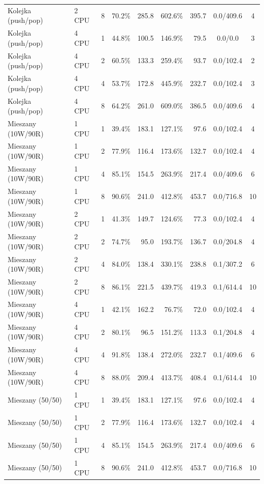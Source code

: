 \begin{table}[ht]
{\begin{tabular}{llcrrrrcc}
Kolejka (push/pop) & 2 CPU & 8 & 70.2\% & 285.8 & 602.6\% & 395.7 & 0.0/409.6 & 4 \\
Kolejka (push/pop) & 4 CPU & 1 & 44.8\% & 100.5 & 146.9\% & 79.5 & 0.0/0.0 & 3 \\
Kolejka (push/pop) & 4 CPU & 2 & 60.5\% & 133.3 & 259.4\% & 93.7 & 0.0/102.4 & 2 \\
Kolejka (push/pop) & 4 CPU & 4 & 53.7\% & 172.8 & 445.9\% & 232.7 & 0.0/102.4 & 3 \\
Kolejka (push/pop) & 4 CPU & 8 & 64.2\% & 261.0 & 609.0\% & 386.5 & 0.0/409.6 & 4 \\
Mieszany (10W/90R) & 1 CPU & 1 & 39.4\% & 183.1 & 127.1\% & 97.6 & 0.0/102.4 & 4 \\
Mieszany (10W/90R) & 1 CPU & 2 & 77.9\% & 116.4 & 173.6\% & 132.7 & 0.0/102.4 & 4 \\
Mieszany (10W/90R) & 1 CPU & 4 & 85.1\% & 154.5 & 263.9\% & 217.4 & 0.0/409.6 & 6 \\
Mieszany (10W/90R) & 1 CPU & 8 & 90.6\% & 241.0 & 412.8\% & 453.7 & 0.0/716.8 & 10 \\
Mieszany (10W/90R) & 2 CPU & 1 & 41.3\% & 149.7 & 124.6\% & 77.3 & 0.0/102.4 & 4 \\
Mieszany (10W/90R) & 2 CPU & 2 & 74.7\% & 95.0 & 193.7\% & 136.7 & 0.0/204.8 & 4 \\
Mieszany (10W/90R) & 2 CPU & 4 & 84.0\% & 138.4 & 330.1\% & 238.8 & 0.1/307.2 & 6 \\
Mieszany (10W/90R) & 2 CPU & 8 & 86.1\% & 221.5 & 439.7\% & 419.3 & 0.1/614.4 & 10 \\
Mieszany (10W/90R) & 4 CPU & 1 & 42.1\% & 162.2 & 76.7\% & 72.0 & 0.0/102.4 & 4 \\
Mieszany (10W/90R) & 4 CPU & 2 & 80.1\% & 96.5 & 151.2\% & 113.3 & 0.1/204.8 & 4 \\
Mieszany (10W/90R) & 4 CPU & 4 & 91.8\% & 138.4 & 272.0\% & 232.7 & 0.1/409.6 & 6 \\
Mieszany (10W/90R) & 4 CPU & 8 & 88.0\% & 209.4 & 413.7\% & 408.4 & 0.1/614.4 & 10 \\
Mieszany (50/50) & 1 CPU & 1 & 39.4\% & 183.1 & 127.1\% & 97.6 & 0.0/102.4 & 4 \\
Mieszany (50/50) & 1 CPU & 2 & 77.9\% & 116.4 & 173.6\% & 132.7 & 0.0/102.4 & 4 \\
Mieszany (50/50) & 1 CPU & 4 & 85.1\% & 154.5 & 263.9\% & 217.4 & 0.0/409.6 & 6 \\
Mieszany (50/50) & 1 CPU & 8 & 90.6\% & 241.0 & 412.8\% & 453.7 & 0.0/716.8 & 10 \\

\end{tabular}}
\end{table}
